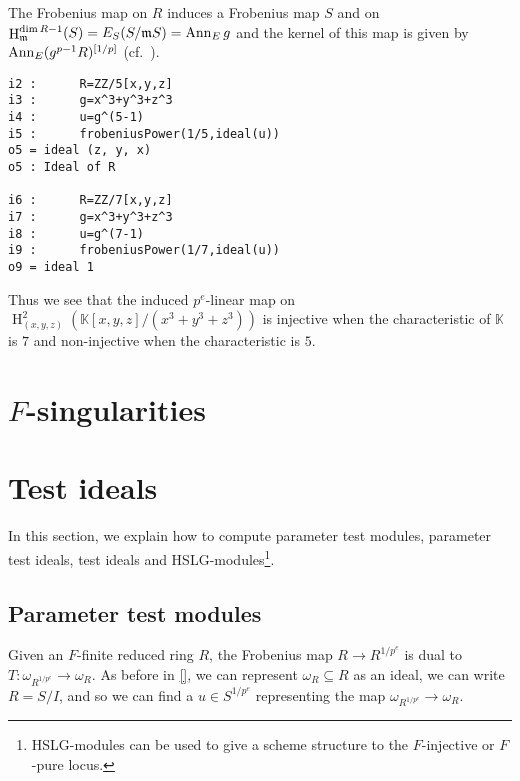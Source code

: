 \documentclass[11pt]{amsart}
\DeclareMathOperator{\HH}{H}
\begin{document}
The Frobenius map on $R$ induces a Frobenius map $S$ and on
$\HH^{\dim R-1}_{\mathfrak{m}} (S)=E_S(S/\mathfrak{m}S)=\Ann_E g$ and the kernel of this map is given by
$\operatorname{{Ann}}_E (g^{p-1}R)^{[1/p]}$ (cf.~\cite[\S 5]{KatzmanParameterTestIdealOfCMRings}).

\begin{verbatim}
i2 :      R=ZZ/5[x,y,z]
i3 :      g=x^3+y^3+z^3
i4 :      u=g^(5-1)
i5 :      frobeniusPower(1/5,ideal(u))
o5 = ideal (z, y, x)
o5 : Ideal of R

i6 :      R=ZZ/7[x,y,z]
i7 :      g=x^3+y^3+z^3
i8 :      u=g^(7-1)
i9 :      frobeniusPower(1/7,ideal(u))
o9 = ideal 1
\end{verbatim}

Thus we see that the induced $p^{e}$-linear map on $\HH_{(x,y,z)}^{2} \left( \mathbb{K}[x,y,z]/(x^3+y^3+z^3) \right)$ is injective
when the characteristic of $\mathbb{K}$ is $7$ and non-injective when the characteristic is $5$.



\section{$F$-singularities}

\section{Test ideals}

In this section, we explain how to compute parameter test modules, parameter test ideals, test ideals and HSLG-modules\footnote{HSLG-modules can be used to give a scheme structure to the $F$-injective or $F$-pure locus.}.

\subsection{Parameter test modules}

Given an $F$-finite reduced ring $R$, the Frobenius map $R \to R^{1/p^e}$ is dual to $T : \omega_{R^{1/p^e}} \to \omega_R$.  As before in \autoref{}, we can represent $\omega_R \subseteq R$ as an ideal, we can write $R = S/I$, and so we can find a $u \in S^{1/p^e}$ representing the map $\omega_{R^{1/p^e}} \to \omega_R$.
\end{document}
